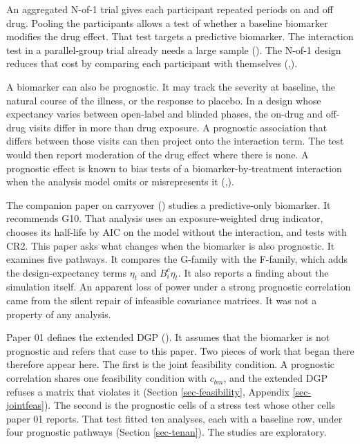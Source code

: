 \documentclass[
  11pt,
]{article}
\newcounter{none} %
\begin{document}
An aggregated N-of-1 trial gives each participant repeated periods on
and off drug. Pooling the participants allows a test of whether a
baseline biomarker modifies the drug effect. That test targets a
predictive biomarker. The interaction test in a parallel-group trial
already needs a large sample (). The N-of-1 design
reduces that cost by comparing each participant with themselves
(,).

A biomarker can also be prognostic. It may track the severity at
baseline, the natural course of the illness, or the response to
placebo. In a design whose expectancy varies between open-label and
blinded phases, the on-drug and off-drug visits differ in more than
drug exposure. A prognostic association that differs between those
visits can then project onto the interaction term. The test would
then report moderation of the drug effect where there is none. A
prognostic effect is known to bias tests of a
biomarker-by-treatment interaction when the analysis model omits or
misrepresents it (,).

The companion paper on carryover () studies a
predictive-only biomarker. It recommends G10. That analysis uses an
exposure-weighted drug indicator, chooses its half-life by AIC on the
model without the interaction, and tests with CR2. This paper asks
what changes when the biomarker is also prognostic. It examines five
pathways. It compares the G-family with the F-family, which adds the
design-expectancy terms \(\eta_t\) and \(B^c_i\eta_t\). It also reports
a finding about the simulation itself. An apparent loss of power
under a strong prognostic correlation came from the silent repair of
infeasible covariance matrices. It was not a property of any
analysis.

Paper 01 defines the extended DGP (). It assumes
that the biomarker is not prognostic and refers that case to this
paper. Two pieces of work that began there therefore appear here. The
first is the joint feasibility condition.
A prognostic correlation shares one feasibility condition with
\(c_{bm}\), and the extended DGP refuses a matrix that violates it
(Section \ref{sec-feasibility}, Appendix \ref{sec-jointfeas}). The
second is the prognostic cells of a stress test whose other cells
paper 01 reports. That test fitted ten analyses, each with a baseline
row, under four prognostic pathways (Section \ref{sec-tenan}). The studies are
exploratory.
\end{document}
